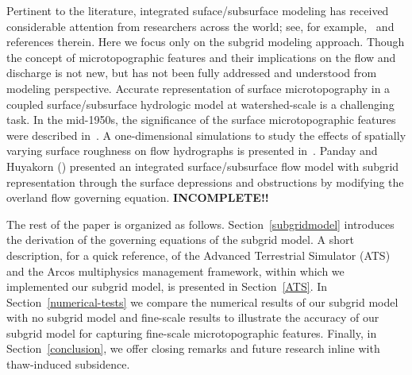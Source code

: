 \documentclass[review,11pt]{elsarticle}
\begin{document}







Pertinent to the literature, integrated suface/subsurface modeling has received considerable attention from researchers across the world; see, for example,~\cite{painter2013modeling,kurylyk2014climate,spainter2016integrated} and references therein. Here we focus only on the subgrid modeling approach. Though the concept of microtopographic features and their implications on the flow and discharge is not new, but has not been fully addressed and understood from modeling perspective. Accurate representation of surface microtopography in a coupled surface/subsurface hydrologic model at watershed-scale is a challenging task. 
In the mid-1950s, the significance of the surface microtopographic features were described in~\cite{stammers1956effect}. 
A one-dimensional simulations to study the effects of spatially varying surface roughness on flow hydrographs is presented in~\cite{huang2009influences}.
Panday and Huyakorn (\citeyear{panday2004fully}) presented an integrated surface/subsurface flow model with subgrid representation through the surface depressions and obstructions by modifying the overland flow governing equation. \textbf{INCOMPLETE!!}

The rest of the paper is organized as follows. Section~\ref{subgridmodel} introduces the derivation of the governing equations of the subgrid model. A short description, for a quick reference, of the Advanced Terrestrial Simulator (ATS) and the Arcos multiphysics management framework, within which we implemented our subgrid model, is presented in Section~\ref{ATS}. In Section~\ref{numerical-tests} we compare the numerical results of our subgrid model with no subgrid model and fine-scale results to illustrate the accuracy of our subgrid model for capturing fine-scale microtopographic features. Finally, in Section~\ref{conclusion}, we offer closing remarks and future research inline with thaw-induced subsidence.
\end{document}
